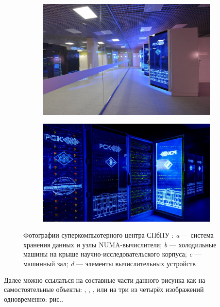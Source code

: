 \begin{figure}[ht]
\begin{subfigure}[t]{\dimexpr.5\linewidth-1.3em\relax}
	\includegraphics[width=.95\linewidth,valign=t]{my_folder/images/spbpu_sc_hall}
\end{subfigure}%
\hfill %
%
\begin{subfigure}[t]{\dimexpr.5\linewidth-1.3em\relax}
	\centering
	\includegraphics[width=.95\linewidth,valign=t]{my_folder/images/spbpu_sc_box}
\end{subfigure}
\captionsetup{justification=centering} %
\caption{Фотографии суперкомпьютерного центра СПбПУ \cite{spbpu-gallery}: {\itshape a} --- система хранения данных и узлы NUMA-вычислителя; {\itshape b} --- холодильные машины на крыше научно-исследовательского корпуса; {\itshape c} --- машинный зал; {\itshape d} --- элементы вычислительных устройств} 
\label{fig:spbpu_sc-four-photos}
\end{figure}

Далее можно ссылаться на составные части данного рисунка как на самостоятельные объекты: , , ,  или на три из четырёх изображений одновременно: рис..